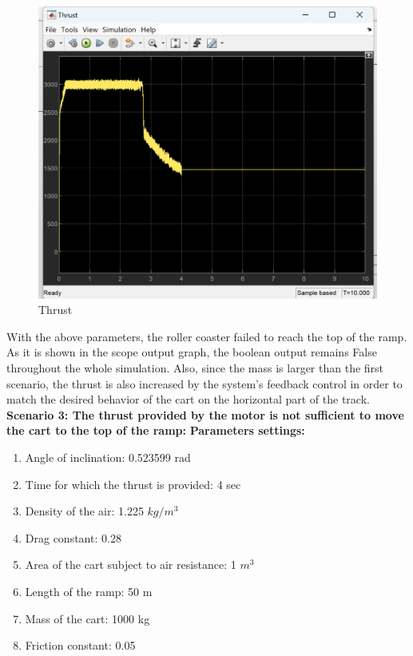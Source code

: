 \documentclass{article}
\begin{document}
    \begin{figure}[H]
        \centering
        \includegraphics[width=0.8\linewidth]{thrust_2.png}
        \caption{Thrust}
        \label{fig:enter-label}
    \end{figure}
    With the above parameters, the roller coaster failed to reach the top of the
    ramp. As it is shown in the scope output graph, the boolean output remains False
    throughout the whole simulation. Also, since the mass is larger than the first
    scenario, the thrust is also increased by the system's feedback control in
    order to match the desired behavior of the cart on the horizontal part of
    the track.
    \newline
    \newline
    \textbf{Scenario 3: The thrust provided by the motor is not sufficient to move
    the cart to the top of the ramp: }
    \newline
    \newline
    \textbf{Parameters settings:}
    \newline
    \begin{enumerate}
        \item Angle of inclination: 0.523599 rad

        \item Time for which the thrust is provided: 4 sec

        \item Density of the air: 1.225 $kg/m^{3}$

        \item Drag constant: 0.28

        \item Area of the cart subject to air resistance: 1 $m^{3}$

        \item Length of the ramp: 50 m

        \item Mass of the cart: 1000 kg

        \item Friction constant: 0.05
    \end{enumerate}
\end{document}
